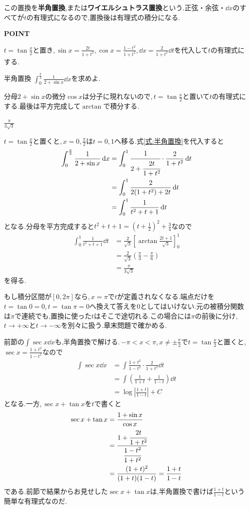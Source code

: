 この置換を\textbf{半角置換},または\textbf{ワイエルシュトラス置換}という.正弦・余弦・$\dd x$のすべてが$t$の有理式になるので,置換後は有理式の積分になる.

\begin{bookpoint}
\textbf{POINT}\par
$t=\tan\frac x2$と置き,\,$\sin x=\frac{2t}{1+t^2}$,\,$\cos x=\frac{1-t^2}{1+t^2}$,\,$\dd x=\frac{2}{1+t^2}\dd t$を代入して$t$の有理式にする.
\end{bookpoint}

\begin{example}{半角置換}
$\int_0^{\frac\pi2}\frac1{2+\sin x}\dd x$を求めよ.
\end{example}

分母$2+\sin x$の微分$\cos x$は分子に現れないので,\,$t=\tan\frac x2$と置いて$t$の有理式にする.最後は平方完成して$\arctan$で積分する.

$\frac\pi{3\sqrt3}$

$t=\tan\frac x2$と置くと,\,$x=0,\frac\pi2$は$t=0,1$へ移る.式\eqref{式:半角置換}を代入すると
\begin{align*}
\int_0^{\frac\pi2}\frac1{2+\sin x}\,\mathrm{d} x
&=\int_0^1\cfrac1{2+\cfrac{2t}{1+t^2}}\cdot
 \frac2{1+t^2}\,\mathrm{d} t\\
&=\int_0^1\frac{2}{2(1+t^2)+2t}\,\mathrm{d} t\\
&=\int_0^1\frac1{t^2+t+1}\,\mathrm{d} t
\end{align*}
となる.分母を平方完成すると$t^2+t+1=\left(t+\frac12\right)^2+\frac34$なので
\begin{align*}
\int_0^1\frac1{t^2+t+1}\dd t
&=\frac2{\sqrt3}\left[\arctan\frac{2t+1}{\sqrt3}\right]_0^1\\
&=\frac2{\sqrt3}\left(\frac\pi3-\frac\pi6\right)\\
&=\frac\pi{3\sqrt3}
\end{align*}
を得る.

もし積分区間が$[0,2\pi]$なら,\,$x=\pi$で$t$が定義されなくなる.端点だけを$t=\tan0=0$,\,$t=\tan\pi=0$へ換えて答えを$0$としてはいけない.元の被積分関数は$\pi$で連続でも,置換に使った$t$はそこで途切れる.この場合には$\pi$の前後に分け,\,$t\to+\infty$と$t\to-\infty$を別々に扱う.章末問題で確かめる.

前節の$\int\sec x\dd x$も,半角置換で解ける.\,$-\pi<x<\pi$,\,$x\ne\pm\frac\pi2$で$t=\tan\frac x2$と置くと,\,$\sec x=\frac{1+t^2}{1-t^2}$なので
\begin{align*}
\int\sec x\dd x
&=\int\frac{1+t^2}{1-t^2}\cdot\frac{2}{1+t^2}\dd t\\
&=\int\left(\frac1{1+t}+\frac1{1-t}\right)\dd t\\
&=\log\left|\frac{1+t}{1-t}\right|+C
\end{align*}
となる.一方,\,$\sec x+\tan x$を$t$で書くと
\begin{align*}
\sec x+\tan x
&=\frac{1+\sin x}{\cos x}\\
&=\cfrac{1+\cfrac{2t}{1+t^2}}{\cfrac{1-t^2}{1+t^2}}\\
&=\frac{(1+t)^2}{(1+t)(1-t)}
=\frac{1+t}{1-t}
\end{align*}
である.前節で結果からお見せした$\sec x+\tan x$は,半角置換で書けば$\frac{1+t}{1-t}$という簡単な有理式なのだ.
